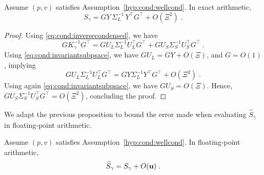 \begin{proposition}
  Assume $(p, v)$ satisfies Assumption~\ref{hyp:cond:wellcond}.
  In exact arithmetic,
  \begin{equation}
    S_\gamma = GY \, \Sigma_L^{-1} \, Y^\top G^\top + O(\Xi^2) \; .
  \end{equation}
\end{proposition}
\begin{proof}
  Using \eqref{eq:cond:inversecondensed}, we have
  \begin{equation}
    G K_\gamma^{-1} G^\top =
    G U_L \Sigma_L^{-1} U_L^\top G^\top + G U_S \Sigma_S^{-1} U_S^\top G^\top \;.
  \end{equation}
  Using \eqref{eq:cond:invariantsubpsace}, we have $G U_L = GY + O(\Xi)$,
  and $G = O(1)$, implying
  \begin{equation}
    G U_L \Sigma_L^{-1} U_L^\top G^\top = G Y  \Sigma_L^{-1} Y^\top G^\top + O(\Xi^2) \; .
  \end{equation}
  Using again \eqref{eq:cond:invariantsubpsace}, we have $G U_S = O(\Xi)$.
  Hence, $G U_S \Sigma_S^{-1} U_S^\top G^\top = O(\Xi^2)$,
  concluding the proof.
\end{proof}
We adapt the previous proposition to bound the error made when evaluating
$\widehat{S}_\gamma$ in floating-point arithmetic.
\begin{proposition}
  Assume $(p, v)$ satisfies Assumption~\ref{hyp:cond:wellcond}.
  In floating-point arithmetic,
  \begin{equation}
    \label{eq:cond:errorSgamma}
    \widehat{S}_\gamma = S_\gamma + O(\mathbf{u}) \; .
  \end{equation}
\end{proposition}

